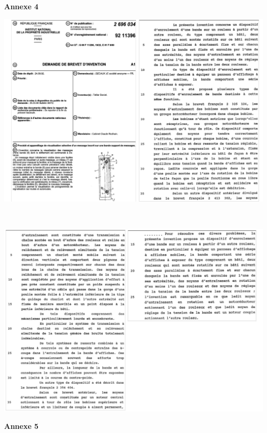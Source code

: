 \textbf{Annexe 4}

\begin{center}
 \includegraphics[width=0.9\linewidth]{img/annexe4_1}

~\

 \includegraphics[width=0.9\linewidth]{img/annexe4_2}
\end{center}

\newpage

\textbf{Annexe 5}

